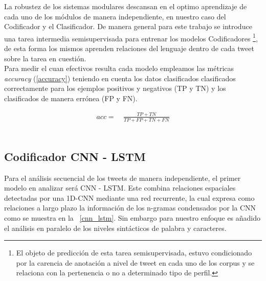 	 La robustez de los sistemas modulares descansan en el optimo aprendizaje de cada uno de los módulos de manera independiente, en nuestro caso del Codificador y el Clasificador. De manera general para este trabajo se introduce una tarea intermedia semisupervisada para entrenar los modelos Codificadores \footnote{El objeto de predicción de esta tarea semisupervisada, estuvo condicionado por la carencia de anotación a nivel de tweet en cada uno de los corpus y se relaciona con la pertenencia o no a determinado tipo de perfil.}, de esta forma los mismos aprenden relaciones del lenguaje dentro de cada tweet sobre la tarea en cuestión.\\
	 Para medir el cuan efectivos resulta cada modelo empleamos las métricas \textit{accuracy} (\ref{accuracy}) teniendo en cuenta los datos clasificados clasificados correctamente para los ejemplos positivos y negativos (TP y TN) y los clasificados de manera errónea (FP y FN).
	 
	 \begin{align}
	 	acc=~& \frac{TP + TN}{TP + FP + TN + FN}\label{accuracy}
	 \end{align}\\%
 
 	\subsection{Codificador CNN - LSTM}
 	
 	Para el análisis secuencial de los tweets de manera independiente, el primer modelo en analizar será CNN - LSTM. Este combina relaciones espaciales detectadas por una 1D-CNN mediante una red recurrente, la cual expresa como relaciones a largo plazo la información de los n-gramas condensados por la CNN como se muestra en la \figurename~\ref{cnn_lstm}.   Sin embargo para nuestro enfoque es añadido el análisis en paralelo de los niveles sintácticos de palabra y caracteres.  	\\
 	
